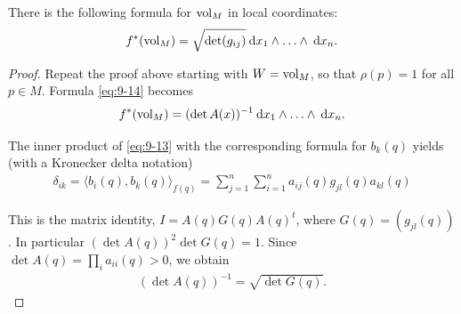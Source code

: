 \begin{addendum}\label{addendum:9-17}
  There is the following formula for $\mathrm{vol}_M$ in local coordinates:
  \begin{align}\label{eq:9-15}
    f^*(\R{vol}_M) = \sqrt{\det (g_{ij})} \dd x_1\wedge\ldots\wedge\dd x_n.
  \end{align}
\end{addendum}

\begin{proof}
  Repeat the proof above starting with $W = \mathrm{vol}_M$, so that $\rho(p) = 1$ for all
$p\in M$. Formula \eqref{eq:9-14} becomes
\begin{align}\label{eq:9-16}
  f^*(\R{vol}_M) = (\det A(x))^{-1}\dd x_1\wedge\ldots\wedge\dd x_n.
\end{align}

The inner product of \eqref{eq:9-13} with the corresponding formula for $b_k(q)$ yields (with
a Kronecker delta notation)
\begin{align*}
  \delta_{ik} = \langle b_i(q), b_k(q) \rangle_{f(q)} 
    = \sum_{j=1}^{n}{\sum_{i=1}^{n}{a_{ij}(q)g_{jl}(q)a_{kl}(q)}}
\end{align*}

This is the matrix identity, $I = A(q) G(q) A(q)^t$, where $G(q) = (g_{jl}(q))$. In
particular $(\det A(q))^2 \det G(q) = 1$. Since $\det A(q) = \prod_i a_{ii}(q)>0$, we 
obtain
\begin{align*}
  (\det A(q))^{-1} = \sqrt{\det G(q)}.
\end{align*}
\end{proof}

